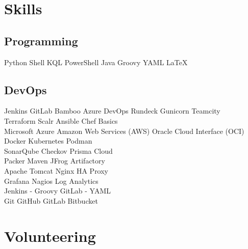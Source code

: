 \documentclass[a4paper]{deedy-resume-openfont}
\begin{document}
\begin{minipage}[t]{0.33\textwidth}

\section{Skills}
\subsection{Programming}
Python \textbullet{}  Shell \textbullet{} KQL \textbullet{} PowerShell 
 \textbullet{} Java \textbullet{} Groovy \textbullet{} YAML \textbullet{} \LaTeX \\ 
 \sectionsep
\subsection{DevOps}
Jenkins \textbullet{} GitLab \textbullet{} Bamboo \textbullet{} Azure DevOps \textbullet{} Rundeck \textbullet{} Gunicorn \textbullet{} Teamcity \\
Terraform \textbullet{} Scalr \textbullet{} Ansible \textbullet{} Chef Basics \\
Microsoft Azure \textbullet{} Amazon Web Services (AWS) \textbullet{} Oracle Cloud Interface (OCI)\\
Docker \textbullet{} Kubernetes \textbullet{} Podman \\
SonarQube \textbullet{} Checkov \textbullet{} Prisma Cloud \\
Packer \textbullet{} Maven \textbullet{} JFrog Artifactory \\
Apache Tomcat \textbullet{} Nginx \textbullet{} HA Proxy \\
Grafana \textbullet{} Nagios \textbullet{} Log Analytics \\
Jenkins - Groovy \textbullet{} GitLab - YAML \\
Git \textbullet{} GitHub \textbullet{} GitLab \textbullet{} Bitbucket \\


\section{Volunteering}

\end{minipage}
\end{document}
